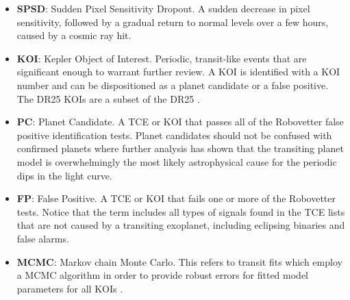 \begin{itemize}
\item[] \textbf{SPSD}: Sudden Pixel Sensitivity Dropout.  A sudden decrease in pixel sensitivity, followed by a gradual return to normal levels over a few hours, caused by a cosmic ray hit.
\item[] \textbf{KOI}: Kepler Object of Interest. Periodic, transit-like events that are significant enough to warrant further review. A KOI is identified with a KOI number and can be dispositioned as a planet candidate or a false positive. The DR25 KOIs are a subset of the DR25 .
\item[] \textbf{PC}: Planet Candidate. A TCE or KOI that passes all of the Robovetter false positive identification tests. Planet candidates should not be confused with confirmed planets where further analysis has shown that the transiting planet model is overwhelmingly the most likely astrophysical cause for the periodic dips in the \Kepler{} light curve.
\item[] \textbf{FP}: False Positive. A TCE or KOI that fails one or more of the Robovetter tests. Notice that the term includes all types of signals found in the TCE lists that are not caused by a transiting exoplanet, including eclipsing binaries and false alarms.
\item[] \textbf{MCMC}: Markov chain Monte Carlo. This refers to transit fits which employ a MCMC algorithm in order to provide robust errors for fitted model parameters for all KOIs
 \citep{Hoffman2017}.



\end{itemize}